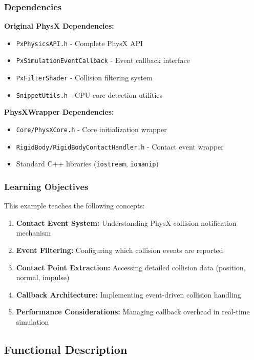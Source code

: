 \subsubsection{Dependencies}

\textbf{Original PhysX Dependencies:}
\begin{itemize}
    \item \texttt{PxPhysicsAPI.h} - Complete PhysX API
    \item \texttt{PxSimulationEventCallback} - Event callback interface
    \item \texttt{PxFilterShader} - Collision filtering system
    \item \texttt{SnippetUtils.h} - CPU core detection utilities
\end{itemize}

\textbf{PhysXWrapper Dependencies:}
\begin{itemize}
    \item \texttt{Core/PhysXCore.h} - Core initialization wrapper
    \item \texttt{RigidBody/RigidBodyContactHandler.h} - Contact event wrapper
    \item Standard C++ libraries (\texttt{iostream}, \texttt{iomanip})
\end{itemize}

\subsubsection{Learning Objectives}

This example teaches the following concepts:
\begin{enumerate}
    \item \textbf{Contact Event System:} Understanding PhysX collision notification mechanism
    \item \textbf{Event Filtering:} Configuring which collision events are reported
    \item \textbf{Contact Point Extraction:} Accessing detailed collision data (position, normal, impulse)
    \item \textbf{Callback Architecture:} Implementing event-driven collision handling
    \item \textbf{Performance Considerations:} Managing callback overhead in real-time simulation
\end{enumerate}


\subsection{Functional Description}

